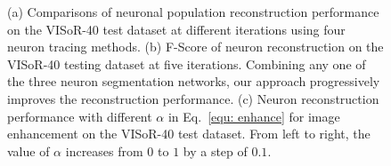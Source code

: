 \begin{figure}[t]
	\centering
	\caption{
		(a) Comparisons of neuronal population reconstruction performance on the VISoR-40 test dataset at different iterations using four neuron tracing methods. 
		(b) F-Score of neuron reconstruction on the VISoR-40 testing dataset at five iterations. Combining any one of the three neuron segmentation networks, our approach progressively improves the reconstruction performance.
		(c) Neuron reconstruction performance with different $\alpha$ in Eq.~\eqref{equ: enhance} for image enhancement on the VISoR-40 test dataset. From left to right, the value of $\alpha$ increases from $0$ to $1$ by a step of $0.1$.}
	\label{fig:ablation_study_plnpr}
\end{figure}


